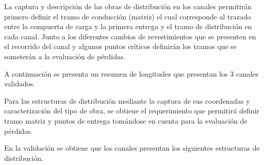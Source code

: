 \documentclass[]{article}
\begin{document}
La captura y descripción de las obras de distribución en los canales permitirán primero definir el tramo de conducción (matriz) el cual corresponde al trazado entre la compuerta de carga y la primera entrega y el tramo de distribución en cada canal. Junto a los diferentes cambios de revestimientos que se presenten en el recorrido del canal y algunos puntos críticos definirán los tramos que se someterán a la evaluación de pérdidas. 

A continuación se presenta un resumen de longitudes que presentan los 3 canales validados.

\begin{table}[H]
\centering
\caption{Longitudes por canal}
\label{my-label}
\end{table}

Para las estructuras de distribución mediante la captura de sus coordenadas y caracterización del tipo de obra, se obtiene el requerimiento que permitirá definir tramo matriz y puntos de entrega tomándose en cuenta para la evaluación de pérdidas. 

En la validación se obtiene que los canales presentan los siguientes estructuras de distribución.
\end{document}
